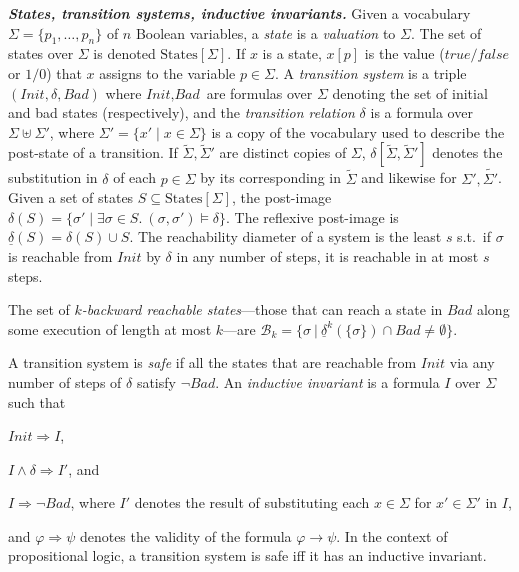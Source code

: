 \documentclass[acmsmall,screen]{acmart}
\newcommand{\para}[1]{\vspace{2pt}\noindent\textbf{\textit{#1.}}}
\renewcommand{\implies}{\Longrightarrow}
\newcommand{\true}{{\textit{true}}}
\newcommand{\false}{{\textit{false}}}
\newcommand{\vocabulary}{\Sigma}
\newcommand{\voc}{\vocabulary}
\newcommand{\Init}{{\textit{Init}}}
\newcommand{\Bad}{\textit{Bad}}
\newcommand{\States}{{\mbox{States}}[\voc]}
\newcommand{\tr}{\delta}
\newcommand{\set}[1]{\{{#1}\}}
\newcommand{\prop}{x}
\newcommand{\reflextr}[1]{\underline{#1}}
\newcommand{\postimage}[2]{{\reflextr{#1}}({#2})}
\newcommand{\bmcunroll}[2]{{\reflextr{#1}}^{{#2}}}
\newcommand{\bmc}[3]{\bmcunroll{#1}{#3}({#2})}
\newcommand{\bkwrch}[1]{\mathcal{B}_{#1}}
\begin{document}
\para{States, transition systems, inductive invariants}
Given a vocabulary $\voc = \set{p_1,\ldots,p_n}$ of $n$ Boolean variables, a \emph{state} is a \emph{valuation} to $\voc$. The set of states over $\voc$ is denoted $\States$.
If $x$ is a state, $x[p]$ is the value ($\true/\false$ or $1/0$) that $x$ assigns to the variable $p \in \voc$.
%
A \emph{transition system} is a triple $(\Init,\tr,\Bad)$ where $\Init,\Bad$ are formulas over $\voc$ denoting the set of initial and bad states (respectively), and the \emph{transition relation} $\tr$ is a formula over $\voc \uplus \voc'$, where $\voc' = \{ \prop' \mid \prop \in \voc\}$ is a copy of the vocabulary used to describe the post-state of a transition.
If $\tilde{\voc},\tilde{\voc}'$ are distinct copies of $\voc$, $\tr[\tilde{\voc},\tilde{\voc}']$ denotes the substitution in $\tr$ of each $p \in \voc$ by its corresponding in $\tilde{\voc}$ and likewise for $\voc',\tilde{\voc'}$.
Given a set of states $S \subseteq \States$, the post-image $\tr(S) = \set{\sigma' \mid \exists \sigma \in S. \ (\sigma,\sigma') \models \tr}$.
The reflexive post-image is $\postimage{\tr}{S} = \tr(S) \cup S$.
%
The reachability diameter of a system is the least $s$ s.t.\ if $\sigma$ is reachable from $\Init$ by $\tr$ in any number of steps, it is reachable in at most $s$ steps. %
\begin{changebar}
The set of \emph{$k$-backward reachable states}---those that can reach a state in $\Bad$ along some execution of length at most $k$---are $\bkwrch{k} = \set{\sigma \ | \ \bmc{\tr}{\set{\sigma}}{k} \cap \Bad \neq \emptyset}$.
\end{changebar}
A transition system is \emph{safe} if all the states that are reachable from $\Init$ via any number of steps of $\tr$ satisfy $\neg \Bad$. %
An \emph{inductive invariant} is a formula $I$ over $\voc$ such that
\begin{inparaenum}[(i)]
	\item $\Init \implies I$,
	\item $I \land \tr \implies I'$, and
	\item $I \implies \neg\Bad$, where $I'$ %
denotes the result of substituting each $\prop \in \voc$ for $\prop' \in \voc'$ in $I$,
\end{inparaenum}
and $\varphi \implies \psi$ denotes the validity of the formula $\varphi \to \psi$. In the context of propositional logic, a transition system is safe iff it has an inductive invariant. %
%
%
%
\end{document}
